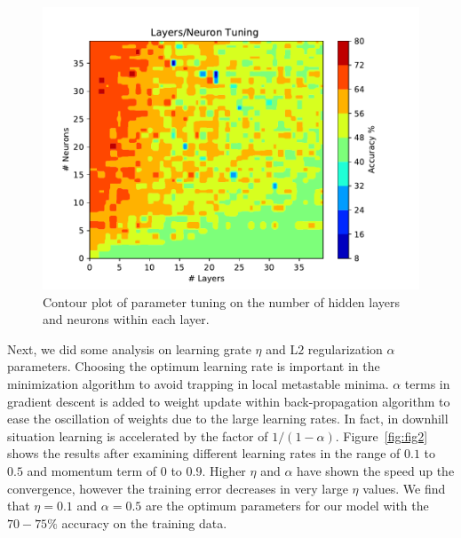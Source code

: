 \documentclass{article}
\newcommand*{\Fig}[1]{Figure~\ref{fig:#1}}
\begin{document}
\begin{figure}[h!] %
	\centering
	\includegraphics[scale = .50]{figs/contour.pdf}
	\caption{\footnotesize Contour plot of parameter tuning on the number of hidden layers and neurons within each layer.}
	\label{fig:fig1}
\end{figure}

\noindent  Next, we did some analysis on learning grate $\eta$ and L$2$ regularization $\alpha$ parameters. Choosing the optimum learning rate is important in the minimization algorithm to avoid trapping in local metastable minima. $\alpha$ terms in gradient descent is added to weight update within back-propagation algorithm to ease the oscillation of weights due to the large learning rates. In fact, in downhill situation learning is accelerated by the factor of $1/(1-\alpha)$. \Fig{fig2} shows the results after examining different learning rates in the range of $0.1$ to $0.5$ and momentum term of $0$ to $0.9$. Higher $\eta$ and $\alpha$ have shown the speed up the convergence, however the training error decreases in very large $\eta$ values. We find that $\eta=0.1$ and $\alpha=0.5$ are the optimum parameters for our model with the $70-75 \%$ accuracy on the training data. 
\end{document}
